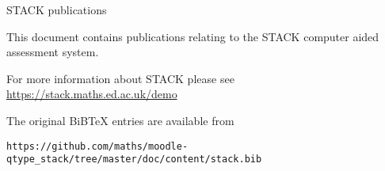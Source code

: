 \documentclass[11pt]{article}
\newcommand{\localputbib}{%
\putbib[stack]
}
\begin{document}


\centerline{\Large STACK publications}
$~$\\[1cm]

This document contains publications relating to the STACK computer aided assessment system.

For more information about STACK please see \href{https://stack.maths.ed.ac.uk/demo}{https://stack.maths.ed.ac.uk/demo}

The original BiBTeX entries are available from
{\scriptsize
\begin{verbatim}
https://github.com/maths/moodle-qtype_stack/tree/master/doc/content/stack.bib
\end{verbatim}
}

\renewcommand\refname{\normalsize Suggestions of where to start}
\begin{bibunit}[unsrt]
\nocite{kinnear_george_2019_2565969,2017MCQ,2013CAA}
\localputbib
\end{bibunit}

\renewcommand\refname{\normalsize Books}
\begin{bibunit}[unsrt]
\nocite{2013CAA,Nakamura2010}
\localputbib
\end{bibunit}

\renewcommand\refname{\normalsize Specific issues}
\begin{bibunit}[unsrt]
\nocite{SangwinRamsden2006,Nakamura2016b,2017STACKUnits,2018Sangwin-equivalence-proof,Sangwin2015Inequalities}
\localputbib
\end{bibunit}

\renewcommand\refname{\normalsize STACK and Examinations}
\begin{bibunit}[unsrt]
\nocite{2016AutomationExaminations,Sangwin2019CERME,Sangwin2018CMEEI}
\localputbib
\end{bibunit}

\renewcommand\refname{\normalsize Research and conference papers}
\begin{bibunit}[unsrt]
\nocite{2018Mastery,Yoshitomi2018,Barbas2016,Nakamura2016,Sangwin2015KHDM}
\nocite{Rasila2016,Rasila2016b,Rasila2016c}
\nocite{Shirai2015a,Shirai2015b,Pavia2015,Nakamura2014,Shirai2014,Nakamura2013}
\nocite{Sangwin2012ICME,Sangwin2013HEA,Lowe2010,Sangwin2009Equality,Sangwin2010IGI,Nakamura2010b}
\nocite{Rasila2010,Sangwin2009Calculumus,Sangwin2009ICMI,Rasila2007}
\nocite{Sangwin2006CASAlgebra,WebALT2006,Sangwin2006UniServe,SangwinTMA03,SangwinHSkills02}
\localputbib
\end{bibunit}
\end{document}
